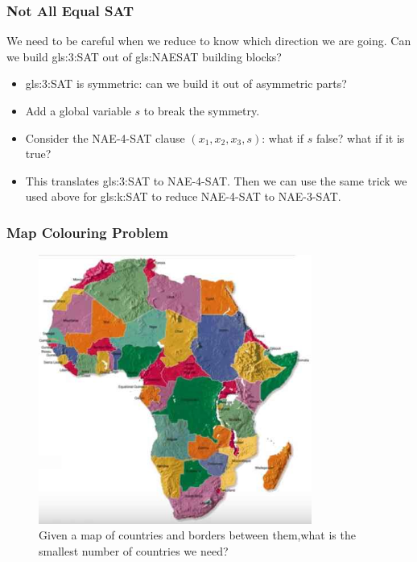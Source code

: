 \documentclass[]{article}
\begin{document}
\subsubsection{Not All Equal SAT}

We need to be careful when we reduce to know which direction we are going.
Can we build \gls{gls:3:SAT} out of \gls{gls:NAESAT} building blocks?
\begin{itemize}
	\item \gls{gls:3:SAT} is symmetric: can we build it out of asymmetric parts?
	\item Add a global variable $s$ to break the symmetry.
	\item Consider the NAE-4-SAT clause $(x_1,x_2,x_3,s)$: what if $s$ false? what if it is true?
	\item This translates  \gls{gls:3:SAT} to NAE-4-SAT. Then we can use the same trick we used above for \gls{gls:k:SAT} to reduce  NAE-4-SAT to NAE-3-SAT.
\end{itemize}

\subsubsection{Map Colouring Problem}
\begin{figure}[H]
	\begin{center}
		\caption[Map Colouring Problem]{Given a map of countries and borders between them,what is the smallest number of countries we need?}\label{fig:MapColouring}
		\includegraphics[width=0.8\textwidth]{MapColouring}
	\end{center}
\end{figure}
\end{document}

